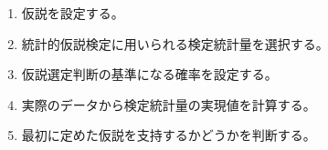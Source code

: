 \begin{enumerate}
	\item 仮説を設定する。
	\item 統計的仮説検定に用いられる検定統計量を選択する。
	\item 仮説選定判断の基準になる確率を設定する。
	\item 実際のデータから検定統計量の実現値を計算する。
	\item 最初に定めた仮説を支持するかどうかを判断する。
\end{enumerate}

